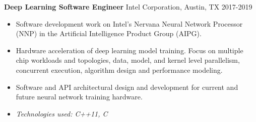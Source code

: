 \textbf{Deep Learning Software Engineer}  Intel Corporation, Austin, TX \hfill 2017-2019

\begin{itemize} \itemsep -2pt

\item Software development work on Intel's Nervana Neural Network
      Processor (NNP) in the Artificial Intelligence Product Group
      (AIPG).

\item Hardware acceleration of deep learning model training.
      Focus on multiple chip workloads and topologies, data,
      model, and kernel level parallelism, concurrent
      execution, algorithm design and performance modeling.

\item Software and API architectural design and development for
      current and future neural network training hardware.

\item \textit{Technologies used: C++11, C}

\end{itemize}
